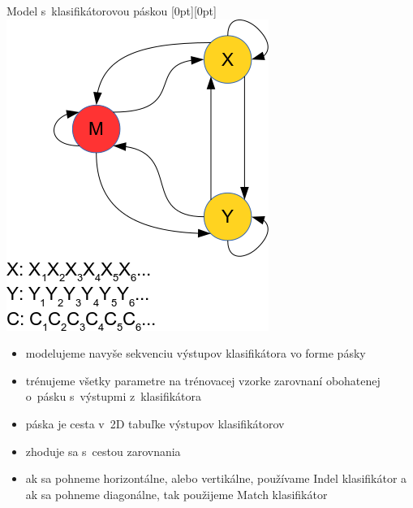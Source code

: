 \documentclass[xcolor=dvipsnames, compress, 12pt]{beamer}
\newcommand{\lenitem}[2][.6\linewidth]{\parbox[t]{#1}{\strut #2\strut}}
\theoremstyle{definition}
\begin{document}


\begin{frame}{Model s~klasifikátorovou páskou}
  \mbox{}\hfill\raisebox{-\height}[0pt][0pt]{
   \includegraphics[width=.30\textwidth]{images/model_clf_paska}
   }
  \vspace*{-\baselineskip}

  \begin{itemize}
      \item \lenitem{modelujeme navyše sekvenciu výstupov klasifikátora vo forme pásky}
      \item \lenitem{trénujeme všetky parametre na trénovacej vzorke zarovnaní obohatenej o~pásku s~výstupmi z~klasifikátora}
  \end{itemize}

  \begin{itemize}
    \item \lenitem{páska je cesta v~2D tabuľke výstupov klasifikátorov}
    \item \lenitem{zhoduje sa s~cestou zarovnania}
    \item ak sa pohneme horizontálne, alebo vertikálne, používame Indel klasifikátor a ak sa pohneme diagonálne, tak použijeme Match klasifikátor
  \end{itemize}
\end{frame}

\end{document}
